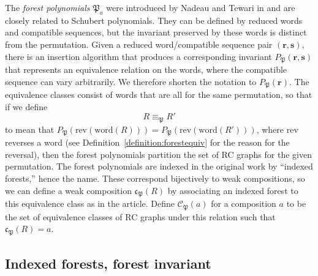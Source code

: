 \documentclass{amsart}
\theoremstyle{definition}
\theoremstyle{remark}
\numberwithin{equation}{subsection}
\newcommand{\forest}{\mathfrak{P}}
\newcommand{\fcode}{\mathfrak{c}_\forest}
\newcommand{\finv}{P_{\forest}}
\begin{document}
The \emph{forest polynomials} $\forest_a$ were introduced by Nadeau and Tewari in \cite{nadeau2024forest} and are closely related to Schubert polynomials. They can be defined by reduced words and compatible sequences, but the invariant preserved by these words is distinct from the permutation. Given a reduced word/compatible sequence pair $(\mathbf{r},\mathbf{s})$, there is an insertion algorithm that produces a corresponding invariant $\finv(\mathbf{r},\mathbf{s})$ that represents an equivalence relation on the words, where the compatible sequence can vary arbitrarily. We therefore shorten the notation to $\finv(\mathbf{r})$. The equivalence classes consist of words that are all for the same permutation, so that if we define
$$R\equiv_{\forest} R'$$
to mean that $\finv(\mathrm{rev}(\mathrm{word}(R))) = \finv(\mathrm{rev}(\mathrm{word}(R')))$, where $\mathrm{rev}$ reverses a word (see Definition~\ref{definition:forestequiv} for the reason for the reversal), then the forest polynomials partition the set of RC graphs for the given permutation. The forest polynomials are indexed in the original work by ``indexed forests,'' hence the name. These correspond bijectively to weak compositions, so we can define a weak composition $\fcode(R)$ by associating an indexed forest to this equivalence class as in the article. Define $\mathcal{C}_\forest(a)$ for a composition $a$ to be the set of equivalence classes of RC graphs under this relation such that $\fcode(R)=a$.


\subsection{Indexed forests, forest invariant}
\end{document}
